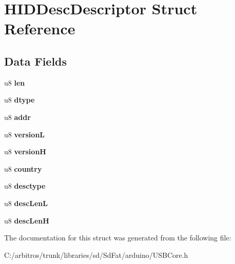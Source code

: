 \hypertarget{struct_h_i_d_desc_descriptor}{\section{H\-I\-D\-Desc\-Descriptor Struct Reference}
\label{struct_h_i_d_desc_descriptor}
}
\subsection*{Data Fields}
\begin{DoxyCompactItemize}
\item 
\hypertarget{struct_h_i_d_desc_descriptor_afbf3f3230446569534d5f466aaf4c23b}{u8 {\bfseries len}}\label{struct_h_i_d_desc_descriptor_afbf3f3230446569534d5f466aaf4c23b}

\item 
\hypertarget{struct_h_i_d_desc_descriptor_a0bb419531ec75697e63e9109fecf81b0}{u8 {\bfseries dtype}}\label{struct_h_i_d_desc_descriptor_a0bb419531ec75697e63e9109fecf81b0}

\item 
\hypertarget{struct_h_i_d_desc_descriptor_a7394c0f7cac587defeae4e84d34fb535}{u8 {\bfseries addr}}\label{struct_h_i_d_desc_descriptor_a7394c0f7cac587defeae4e84d34fb535}

\item 
\hypertarget{struct_h_i_d_desc_descriptor_abbe47c1ab026892a2d5ed0c8690f63c4}{u8 {\bfseries version\-L}}\label{struct_h_i_d_desc_descriptor_abbe47c1ab026892a2d5ed0c8690f63c4}

\item 
\hypertarget{struct_h_i_d_desc_descriptor_a25c3b37fcec9c0b6cd0b3aaa62c904f0}{u8 {\bfseries version\-H}}\label{struct_h_i_d_desc_descriptor_a25c3b37fcec9c0b6cd0b3aaa62c904f0}

\item 
\hypertarget{struct_h_i_d_desc_descriptor_adf7dd313d5179831aef0bd2c06e7fb37}{u8 {\bfseries country}}\label{struct_h_i_d_desc_descriptor_adf7dd313d5179831aef0bd2c06e7fb37}

\item 
\hypertarget{struct_h_i_d_desc_descriptor_ab7b17f5a1f2d18b4fb7f406b6b80d8be}{u8 {\bfseries desctype}}\label{struct_h_i_d_desc_descriptor_ab7b17f5a1f2d18b4fb7f406b6b80d8be}

\item 
\hypertarget{struct_h_i_d_desc_descriptor_ab79e949a76fd9f11acbeda14f76b41d6}{u8 {\bfseries desc\-Len\-L}}\label{struct_h_i_d_desc_descriptor_ab79e949a76fd9f11acbeda14f76b41d6}

\item 
\hypertarget{struct_h_i_d_desc_descriptor_acb9cb52171317c0ea8140dd491c0d00e}{u8 {\bfseries desc\-Len\-H}}\label{struct_h_i_d_desc_descriptor_acb9cb52171317c0ea8140dd491c0d00e}

\end{DoxyCompactItemize}


The documentation for this struct was generated from the following file\-:\begin{DoxyCompactItemize}
\item 
C\-:/arbitros/trunk/libraries/sd/\-Sd\-Fat/arduino/U\-S\-B\-Core.\-h\end{DoxyCompactItemize}
